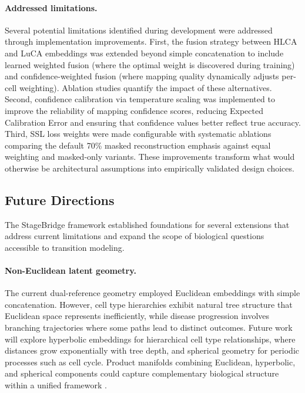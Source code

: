 \paragraph{Addressed limitations.} Several potential limitations identified during development were addressed through implementation improvements. First, the fusion strategy between HLCA and LuCA embeddings was extended beyond simple concatenation to include learned weighted fusion (where the optimal weight is discovered during training) and confidence-weighted fusion (where mapping quality dynamically adjusts per-cell weighting). Ablation studies quantify the impact of these alternatives. Second, confidence calibration via temperature scaling was implemented to improve the reliability of mapping confidence scores, reducing Expected Calibration Error and ensuring that confidence values better reflect true accuracy. Third, SSL loss weights were made configurable with systematic ablations comparing the default 70\% masked reconstruction emphasis against equal weighting and masked-only variants. These improvements transform what would otherwise be architectural assumptions into empirically validated design choices.


\subsection{Future Directions}

The StageBridge framework established foundations for several extensions that address current limitations and expand the scope of biological questions accessible to transition modeling.

\paragraph{Non-Euclidean latent geometry.} The current dual-reference geometry employed Euclidean embeddings with simple concatenation. However, cell type hierarchies exhibit natural tree structure that Euclidean space represents inefficiently, while disease progression involves branching trajectories where some paths lead to distinct outcomes. Future work will explore hyperbolic embeddings for hierarchical cell type relationships, where distances grow exponentially with tree depth, and spherical geometry for periodic processes such as cell cycle. Product manifolds combining Euclidean, hyperbolic, and spherical components could capture complementary biological structure within a unified framework \cite{Palma2025-uk}.

